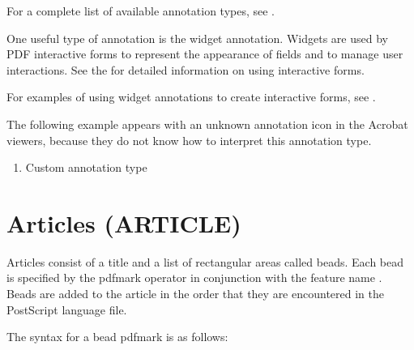 \documentclass[letterpaper,12pt,english,openany,oneside]{sphinxmanual}
\begin{document}
For a complete list of available annotation types, see .

One useful type of annotation is the widget annotation. Widgets are used by PDF interactive forms to represent the appearance of fields and to manage user interactions. See the  for detailed information on using interactive forms.

For examples of using widget annotations to create interactive forms, see .

The following example appears with an unknown annotation icon in the Acrobat viewers, because they do not know how to interpret this annotation type.
\begin{enumerate}
%
\item {} 
Custom annotation type

\end{enumerate}

\begin{sphinxVerbatim}[commandchars=\\\{\}]
\PYG{p}{[}  \PYG{p}{[}   \PYG{p}{]}
     
     \PYG{p}{[}       \PYG{p}{]}
     
\end{sphinxVerbatim}


\section{Articles (ARTICLE)}
\label{\detokenize{pdfmark_Basic:articles-article}}
Articles consist of a title and a list of rectangular areas called beads. Each bead is specified by the pdfmark operator in conjunction with the feature name  . Beads are added to the article in the order that they are encountered in the PostScript language file.

The syntax for a bead pdfmark is as follows:

\begin{sphinxVerbatim}[commandchars=\\\{\}]
 \PYG{p}{[} 

         \PYG{p}{[}
   
\PYG{p}{]}

         
\end{sphinxVerbatim}
\end{document}
